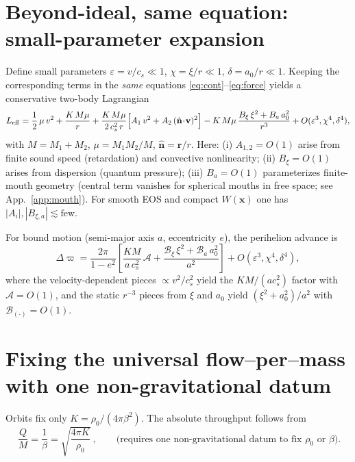 \documentclass[11pt]{article}
\numberwithin{equation}{section}
\theoremstyle{plain}
\theoremstyle{remark}
\theoremstyle{definition}
\begin{document}
\section{Beyond-ideal, same equation: small-parameter expansion}
\label{sec:expansion}
Define small parameters $\varepsilon=v/c_s\ll1$, $\chi=\xi/r\ll1$, $\delta=a_0/r\ll1$.
Keeping the corresponding terms in the \emph{same} equations \eqref{eq:cont}--\eqref{eq:force} yields a conservative two-body Lagrangian
\begin{equation}
L_{\rm eff} = \frac12\,\mu\,v^2 + \frac{K\,M\mu}{r}
+ \frac{K\,M\mu}{2\,c_s^2\,r}\Big[ A_1\,v^2 + A_2\,(\hat{\mathbf n}\!\cdot\!\mathbf v)^2 \Big]
- K\,M\mu\,\frac{B_\xi\,\xi^2+B_a\,a_0^2}{r^3}
+ O(\varepsilon^3,\chi^4,\delta^4),
\label{eq:Leff}
\end{equation}
with $M=M_1+M_2$, $\mu=M_1M_2/M$, $\hat{\mathbf n}=\mathbf r/r$.
Here: (i) $A_{1,2}=O(1)$ arise from finite sound speed (retardation) and convective nonlinearity; (ii) $B_\xi=O(1)$ arises from dispersion (quantum pressure); (iii) $B_a=O(1)$ parameterizes finite-mouth geometry (central term vanishes for spherical mouths in free space; see App.~\ref{app:mouth}).
For smooth EOS and compact $W(\mathbf x)$ one has $|A_i|,|B_{\xi,a}|\lesssim \mathrm{few}$.

For bound motion (semi-major axis $a$, eccentricity $e$), the perihelion advance is
\begin{equation}
\Delta\varpi =\frac{2\pi}{1-e^2}\left[\frac{K M}{a\,c_s^2}\,\mathcal A +\frac{\mathcal B_\xi\,\xi^2+\mathcal B_a\,a_0^2}{a^2}\right]
+ O(\varepsilon^3,\chi^4,\delta^4),
\label{eq:precession}
\end{equation}
where the velocity-dependent pieces $\propto v^2/c_s^2$ yield the $KM/(a c_s^2)$ factor with $\mathcal A=O(1)$, and the static $r^{-3}$ pieces from $\xi$ and $a_0$ yield $(\xi^2+a_0^2)/a^2$ with $\mathcal B_{(\cdot)}=O(1)$.

\section{Fixing the universal flow--per--mass with one non-gravitational datum}
\label{sec:calibration}
Orbits fix only $K=\rho_0/(4\pi\beta^2)$. The absolute throughput follows from
\begin{equation}
\boxed{\ \frac{Q}{M}=\frac{1}{\beta}=\sqrt{\frac{4\pi K}{\rho_0}}\ },
\qquad \text{(requires one non-gravitational datum to fix $\rho_0$ or $\beta$).}
\end{equation}
\end{document}
